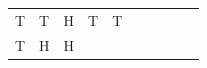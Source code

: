 {\begin{tabular}[t]{|l|l|l|l|l|l|l|l|l|l|}
    
        T &
    
    
        T &
    
    
        H &
    
    
        T &
    
    
        T%
     \tabularnewline\cline{1-1}\cline{2-2}\cline{3-3}\cline{4-4}\cline{5-5}\cline{6-6}\cline{7-7}\cline{8-8}\cline{9-9}\cline{10-10}
    
    
        T &
    
    
        H &
    
    
        H &
    
    

\end{tabular}}
